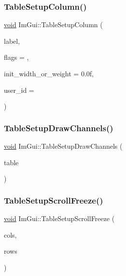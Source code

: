 \mbox{\label{namespaceImGui_a4ac0fd352082b1aa9a2a5a1dedcf5b89}} 
\subsubsection{\texorpdfstring{Table\+Setup\+Column()}{TableSetupColumn()}}
{\footnotesize\ttfamily \hyperlink{imgui__impl__opengl3__loader_8h_ac668e7cffd9e2e9cfee428b9b2f34fa7}{void} Im\+Gui\+::\+Table\+Setup\+Column (\begin{DoxyParamCaption}\item[{const char $\ast$}]{label,  }\item[{Im\+Gui\+Table\+Column\+Flags}]{flags = {},  }\item[{float}]{init\+\_\+width\+\_\+or\+\_\+weight = {\ttfamily 0.0f},  }\item[{Im\+Gui\+ID}]{user\+\_\+id = {} }\end{DoxyParamCaption})}

\mbox{\label{namespaceImGui_aa15ef562cd5d5166e9774472fc6d10c6}} 
\subsubsection{\texorpdfstring{Table\+Setup\+Draw\+Channels()}{TableSetupDrawChannels()}}
{\footnotesize\ttfamily \hyperlink{imgui__impl__opengl3__loader_8h_ac668e7cffd9e2e9cfee428b9b2f34fa7}{void} Im\+Gui\+::\+Table\+Setup\+Draw\+Channels (\begin{DoxyParamCaption}\item[{\hyperlink{structImGuiTable}{Im\+Gui\+Table} $\ast$}]{table }\end{DoxyParamCaption})}

\mbox{\label{namespaceImGui_a3be97defe1cb195b220dccac4e9d3084}} 
\subsubsection{\texorpdfstring{Table\+Setup\+Scroll\+Freeze()}{TableSetupScrollFreeze()}}
{\footnotesize\ttfamily \hyperlink{imgui__impl__opengl3__loader_8h_ac668e7cffd9e2e9cfee428b9b2f34fa7}{void} Im\+Gui\+::\+Table\+Setup\+Scroll\+Freeze (\begin{DoxyParamCaption}\item[{int}]{cols,  }\item[{int}]{rows }\end{DoxyParamCaption})}


